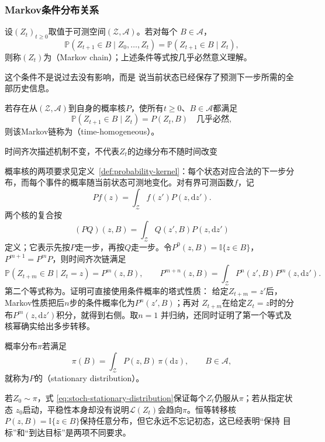 \subsubsection{Markov条件分布关系}
\label{sec:rv-markov}
\begin{definition}[Markov链]
  \label{def:stoch-markov-chain}
设$(Z_t)_{t\geq0}$取值于可测空间$(\mathcal{Z},\mathcal{A})$。若对每个
$B\in\mathcal{A}$，
\[
  \mathbb{P}(Z_{t+1}\in B\mid Z_0,\ldots,Z_t)
  =
  \mathbb{P}(Z_{t+1}\in B\mid Z_t),
\]
则称$(Z_t)$为（Markov chain）；上述条件等式按几乎必然意义理解。
\end{definition}
这个条件不是说过去没有影响，而是
说当前状态已经保存了预测下一步所需的全部历史信息。
\begin{definition}[时间齐次Markov链]
  \label{def:stoch-time-homogeneous-chain}
  若存在从\((\mathcal Z,\mathcal A)\)到自身的概率核\(P\)，使所有\(t\geq0\)、\(B\in\mathcal A\)都满足
  \[ \mathbb P(Z_{t+1}\in B\mid Z_t)=P(Z_t,B)\quad\text{几乎必然}, \]
  则该Markov链称为（time-homogeneous）。
\end{definition}
时间齐次描述机制不变，不代表$Z_t$的边缘分布不随时间改变

概率核的两项要求见定义~\ref{def:probability-kernel}：每个状态对应合法的下一步分布，而每个事件的概率随当前状态可测地变化。对有界可测函数$f$，记
\[
  Pf(z)=\int_{\mathcal{Z}}f(z')P(z,\mathrm{d}z').
\]
两个核的复合按
\[
  (PQ)(z,B)
  =
  \int_{\mathcal{Z}}Q(z',B)P(z,\mathrm{d}z')
\]
定义；它表示先按$P$走一步，再按$Q$走一步。令$P^0(z,B)=\mathbb{I}\{z\in B\}$，
$P^{m+1}=P^mP$，则时间齐次链满足
\begin{equation}
  \mathbb{P}(Z_{t+m}\in B\mid Z_t=z)=P^m(z,B),
  \qquad
  P^{m+n}(z,B)
  =
  \int_{\mathcal{Z}}P^n(z',B)P^m(z,\mathrm{d}z').
  \label{eq:stoch-chapman-kolmogorov}
\end{equation}
第二个等式称为。证明可直接使用条件概率的塔式性质：
给定$Z_{t+m}=z'$后，Markov性质把后$n$步的条件概率化为$P^n(z',B)$；再对
$Z_{t+m}$在给定$Z_t=z$时的分布$P^m(z,\mathrm{d}z')$积分，就得到右侧。取$n=1$
并归纳，还同时证明了第一个等式及核幂确实给出多步转移。

\begin{definition}[平稳分布]
  \label{def:stoch-stationary-distribution}
概率分布$\pi$若满足
\begin{equation}
  \pi(B)=\int_{\mathcal{Z}}P(z,B)\,\pi(\mathrm{d}z),
  \qquad B\in\mathcal{A},
  \label{eq:stoch-stationary-distribution}
\end{equation}
就称为$P$的（stationary distribution）。
\end{definition}
若$Z_0\sim\pi$，式
\eqref{eq:stoch-stationary-distribution}保证每个$Z_t$仍服从$\pi$；若从指定状态
$z_0$启动，平稳性本身却没有说明$\mathcal{L}(Z_t)$会趋向$\pi$。恒等转移核
$P(z,B)=\mathbb{I}\{z\in B\}$保持任意分布，但它永远不忘记初态，这已经表明“保持
目标”和“到达目标”是两项不同要求。


